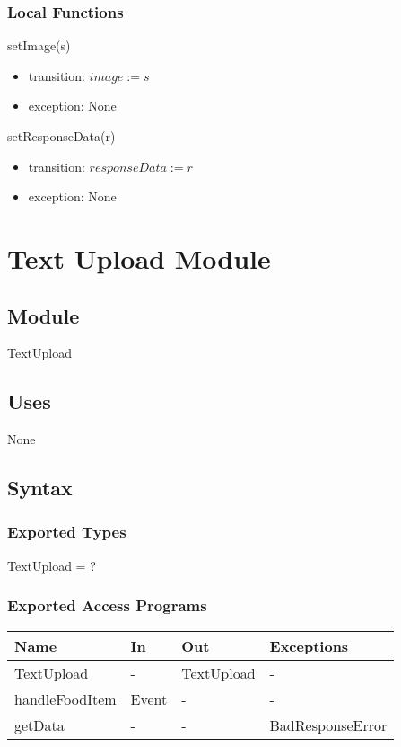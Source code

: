 \documentclass[12pt, titlepage]{article}
\begin{document}
\subsubsection{Local Functions}
\noindent setImage(s)
\begin{itemize}
	\item transition: $ image :=s $
	\item exception: None
\end{itemize}
\noindent setResponseData(r)
\begin{itemize}
	\item transition: $ responseData:=r $
	\item exception: None
\end{itemize}

\newpage

\section{Text Upload Module} \label{TextUpload}
\subsection{Module}
TextUpload
\subsection{Uses}
None
\subsection{Syntax}
\subsubsection{Exported Types}
TextUpload = ?
\subsubsection{Exported Access Programs}
\begin{center}
	\begin{tabular}{p{3cm} p{4cm} p{4cm} p{2cm}}
		\hline
		\textbf{Name} & \textbf{In} & \textbf{Out} & \textbf{Exceptions} \\
		\hline
		TextUpload & - & TextUpload & - \\
		handleFoodItem & Event & - & - \\
		getData & - & - & BadResponseError \\
		\hline
	\end{tabular}
\end{center}
\end{document}
